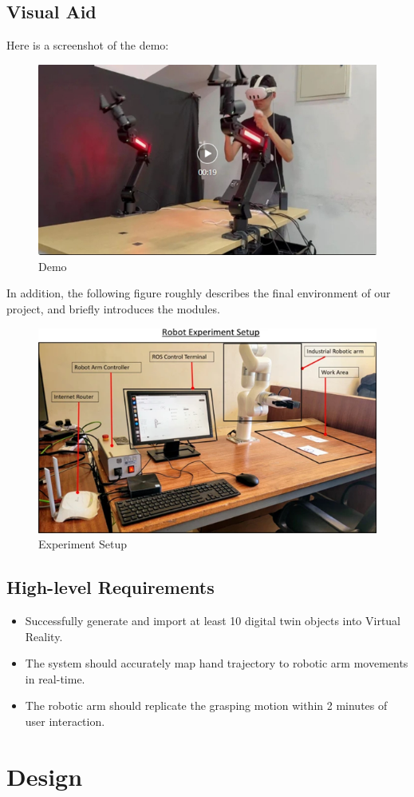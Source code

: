 \documentclass{senior-design}
\begin{document}
\section{Visual Aid}
Here is a screenshot of the demo: 
\begin{figure}[H]
    \centering
    \includegraphics[width=0.6\linewidth]{Demo.png}
    \caption{Demo}
\end{figure}
In addition, the following figure roughly describes the final environment of our project, and briefly introduces the modules.
\begin{figure}[H]
    \centering
    \includegraphics[width=0.6\linewidth]{Robot Experiment Setup.png}
    \caption{Experiment Setup}
\end{figure}
\section{High-level Requirements}
\begin{itemize}
    \item Successfully generate and import at least 10 digital twin objects into Virtual Reality. 
    \item The system should accurately map hand trajectory to robotic arm movements in real-time. 
    \item The robotic arm should replicate the grasping motion within 2 minutes of user interaction. 
\end{itemize}
\chapter{Design}
\end{document}
